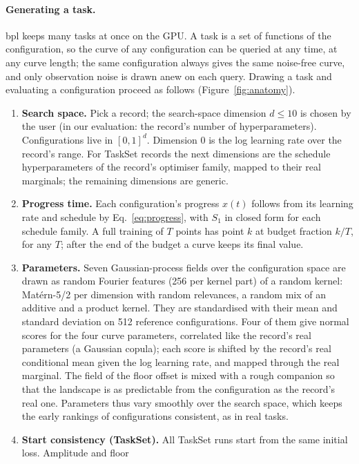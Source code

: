\documentclass[10pt]{article}
\newcommand{\bpl}{\textsf{bpl}}
\begin{document}
\paragraph{Generating a task.} \bpl{} keeps many tasks at once on the GPU. A task is a set of functions of the
configuration, so the curve of any configuration can be queried at any time, at any curve length; the same
configuration always gives the same noise-free curve, and only observation noise is drawn anew on each query.
Drawing a task and evaluating a configuration proceed as follows (Figure~\ref{fig:anatomy}).
\begin{enumerate}
  \item \textbf{Search space.} Pick a record; the search-space dimension $d \le 10$ is chosen by the user (in our
    evaluation: the record's number of hyperparameters). Configurations live in $[0,1]^d$. Dimension 0 is the log learning rate over the record's range. For TaskSet records the next
    dimensions are the schedule hyperparameters of the record's optimiser family, mapped to their real marginals;
    the remaining dimensions are generic.
  \item \textbf{Progress time.} Each configuration's progress $x(t)$ follows from its learning rate and schedule by
    Eq.~\eqref{eq:progress}, with $S_1$ in closed form for each schedule family. A full training of $T$ points has
    point $k$ at budget fraction $k/T$, for any $T$; after the end of the budget a curve keeps its final value.
  \item \textbf{Parameters.} Seven Gaussian-process fields over the configuration space are drawn as random
    Fourier features (256 per kernel part) of a random kernel: Mat\'ern-5/2 per dimension with random relevances, a
    random mix of an additive and a product kernel. They are standardised with their mean and standard deviation
    on 512 reference configurations. Four of them give normal scores for the four curve parameters,
    correlated like the record's real parameters (a Gaussian copula); each score is shifted by the record's real
    conditional mean given the log learning rate, and mapped through the real marginal. The field of the floor
    offset is mixed with a rough companion so that the landscape is as predictable from the configuration as the
    record's real one. Parameters thus vary smoothly over the search space, which keeps the early rankings of
    configurations consistent, as in real tasks.
  \item \textbf{Start consistency (TaskSet).} All TaskSet runs start from the same initial loss. Amplitude and floor

\end{enumerate}
\end{document}

